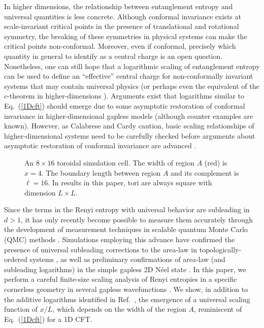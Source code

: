 \documentclass[prl,aps,twocolumn,floatfix,amsmath,amssymb,superscriptaddress,tightenlines]{revtex4}
\begin{document}
In higher dimensions, the relationship between entanglement entropy
and universal quantities is less concrete.  Although conformal
invariance exists at scale-invariant critical points in the presence
of translational and rotational symmetry, the breaking of these
symmetries in physical systems can make the critical points
non-conformal.  Moreover, even if conformal, precisely which quantity
in general to identify as a central charge is an open question.
Nonetheless, one can still hope that a logarithmic scaling of
entanglement entropy can be used to define an ``effective'' central
charge for non-conformally invariant systems that may contain
universal physics (or perhaps even the equivalent of the $c$-theorem
in higher-dimensions \cite{ryu,Myers}).  Arguments exist that
logarithms similar to Eq.~(\ref{1Dcft}) should emerge due to some
asymptotic restoration of conformal invariance in higher-dimensional
gapless models \cite{Shredder} (although counter examples are known).  However, as
Calabrese and Cardy caution, basic scaling relationships of
higher-dimensional systems need to be carefully checked before
arguments about asymptotic restoration of conformal invariance are
advanced \cite{EE_CFT}.

 \begin{figure}[ht]
   \begin{center}
   \end{center}
   \caption{An $8 \times 16$ toroidal simulation cell.  The width of region $A$ (red) is $x=4$.  The boundary length between region $A$ and its complement is $\ell = 16$.  In results in this paper, tori are always square with dimension $L \times L$. }
   \label{fig:torus}
 \end{figure}
 
Since the terms in the Renyi entropy with
universal behavior are subleading in $d>1$, it has only recently become
possible to measure them accurately through the development of measurement
techniques in scalable quantum Monte
Carlo (QMC) methods \cite{swap,XXZ}.  Simulations employing this advance
have confirmed the presence of universal subleading corrections to the
area-law in topologically-ordered systems \cite{isakov}, as well as preliminary
confirmations of area-law (and subleading logarithms) in the simple
gapless 2D N\'eel state \cite{HeisLog}. %
In this paper, we perform a careful
finite-size scaling analysis of Renyi entropies in a specific
cornerless geometry in several gapless wavefunctions \cite{Misguich}.  We show, in
addition to the additive logarithms identified in Ref.~\cite{HeisLog},
the emergence of a universal scaling function of $x/L$, which depends on the
width of the region $A$, reminiscent of Eq.~(\ref{1Dcft}) for a 1D
CFT.
\end{document}
